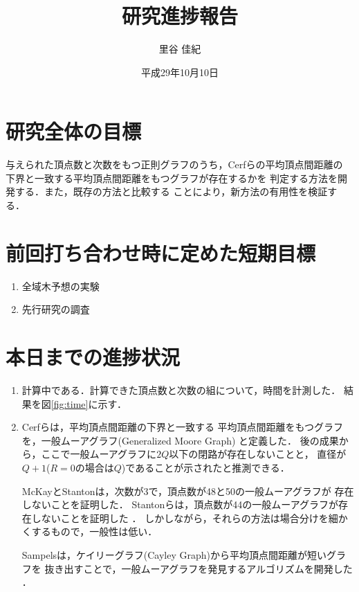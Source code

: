 \documentclass[11pt]{jarticle}
\title{研究進捗報告}
\author{里谷 佳紀}
\date{平成29年10月10日}
\begin{document}
%
\maketitle
\thispagestyle{empty}
%
\section{研究全体の目標}
与えられた頂点数と次数をもつ正則グラフのうち，Cerfらの平均頂点間距離の
下界\cite{Cerf1974}と一致する平均頂点間距離をもつグラフが存在するかを
判定する方法を開発する．また，既存の方法\cite{Yamamoto2016}と比較する
ことにより，新方法の有用性を検証する．

\section{前回打ち合わせ時に定めた短期目標}
\begin{enumerate}
\item 全域木予想の実験
\item 先行研究の調査
\end{enumerate}

\section{本日までの進捗状況}
\begin{enumerate}
\item 計算中である．計算できた頂点数と次数の組について，時間を計測した．
  結果を図\ref{fig:time}に示す．
\item Cerfらは，平均頂点間距離の下界\cite{Cerf1974}と一致する
  平均頂点間距離をもつグラフを，一般ムーアグラフ(Generalized Moore Graph)
  と定義した\cite{cerf1973computer}．
  後の成果から，ここで一般ムーアグラフに$2Q$以下の閉路が存在しないことと，
  直径が$Q+1$($R=0$の場合は$Q$)であることが示されたと推測できる．

  McKayとStantonは，次数が3で，頂点数が48と50の一般ムーアグラフが
  存在しないことを証明した\cite{mckay1979current}．
  Stantonらは，頂点数が44の一般ムーアグラフが存在しないことを証明した
  \cite{Stanton1980}．
  しかしながら，それらの方法は場合分けを細かくするもので，一般性は低い．

  Sampelsは，ケイリーグラフ(Cayley Graph)から平均頂点間距離が短いグラフを
  抜き出すことで，一般ムーアグラフを発見するアルゴリズムを開発した
  \cite{Sampels2004}．
\end{enumerate}
\end{document}
